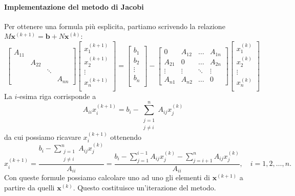 \documentclass[a4paper]{report}
\theoremstyle{definiton}
\theoremstyle{remark}
\newcommand{\x}{\mathbf{x}}
\renewcommand{\b}{\mathbf{b}}
\begin{document}
\paragraph{Implementazione del metodo di Jacobi}
Per ottenere una formula più esplicita, partiamo scrivendo la relazione $M\x^{(k+1)} = \b + N\x^{(k)}$:
\[
\begin{bmatrix}
    A_{11}\\
    & A_{22}\\
    & & \ddots \\
    & & & A_{nn}
\end{bmatrix}
\begin{bmatrix}
    x_1^{(k+1)}\\
    x_2^{(k+1)}\\
    \vdots\\
    x_n^{(k+1)}\\
\end{bmatrix}
=
\begin{bmatrix}
    b_1\\
    b_2\\
    \vdots\\
    b_n\\
\end{bmatrix}
-
\begin{bmatrix}
    0 & A_{12} & \dots & A_{1n}\\
    A_{21} & 0 & \dots & A_{2n}\\
    \vdots & \vdots & \ddots & \vdots\\
    A_{n1} & A_{n2} & \dots & 0
\end{bmatrix}
\begin{bmatrix}
    x_1^{(k)}\\
    x_2^{(k)}\\
    \vdots \\
    x_n^{(k)}\\
\end{bmatrix}
\]
La $i$-esima riga corrisponde a
\[
A_{ii}x_i^{(k+1)} = b_i - \sum_{\substack{j=1\\ j \neq i}}^n A_{ij}x_j^{(k)}
\]
da cui possiamo ricavare $x_i^{(k+1)}$ ottenendo
\[
x_i^{(k+1)} = \frac{b_i - \sum_{\substack{j=1\\ j \neq i}}^n A_{ij}x_j^{(k)}}{A_{ii}} = \frac{b_i - \sum_{j=1}^{i-1} A_{ij}x_j^{(k)} - \sum_{j=i+1}^n A_{ij}x_j^{(k)} }{A_{ii}}, \quad i=1,2,\dots,n.
\]
Con queste formule possiamo calcolare uno ad uno gli elementi di $\x^{(k+1)}$ a partire da quelli $\x^{(k)}$. Questo costituisce un'iterazione del metodo.
\end{document}
